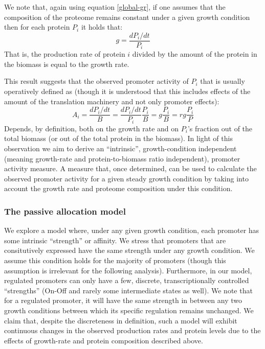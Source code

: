 \documentclass{report}
\begin{document}
We note that, again using equation \ref{global-gr}, if one assumes that the composition of the proteome remains constant under a given growth condition then for each protein $P_i$ it holds that:
\[g=\frac{dP_i/dt}{P_i}\]
That is, the production rate of protein $i$ divided by the amount of the protein in the biomass is equal to the growth rate.

This result suggests that the observed promoter activity of $P_i$ that is usually operatively defined as (though it is understood that this includes effects of the amount of the translation machinery and not only promoter effects):
\begin{equation}
\label{pa-gr-relation}
A_i=\frac{dP_i/dt}{B}=\frac{dP_i/dt}{P_i}\frac{P_i}{B}=g\frac{P_i}{B}=rg\frac{P_i}{P}
\end{equation}
Depends, by definition, both on the growth rate and on $P_i$’s fraction out of the total biomass (or out of the total protein in the biomass).
In light of this observation we aim to derive an “intrinsic”, growth-condition independent (meaning growth-rate and protein-to-biomass ratio independent), promoter activity measure.
A measure that, once determined, can be used to calculate the observed promoter activity for a given steady growth condition by taking into account the growth rate and proteome composition under this condition.
\subsubsection{The passive allocation model}
We explore a model where, under any given growth condition, each promoter has some intrinsic ``strength'' or affinity.
We stress that promoters that are consitutively expressed have the same strength under any growth condition.
We assume this condition holds for the majority of promoters (though this assumption is irrelevant for the following analysis).
Furthermore, in our model, regulated promoters can only have a few, discrete, transcriptionally controlled ``strengths'' (On-Off and rarely some intermediate states as well).
We note that for a regulated promoter, it will have the same strength in between any two growth conditions between which its specific regulation remains unchanged.
We claim that, despite the discreteness in definition, such a model will exhibit continuous changes in the observed production rates and protein levels due to the effects of growth-rate and protein composition described above.
\end{document}
